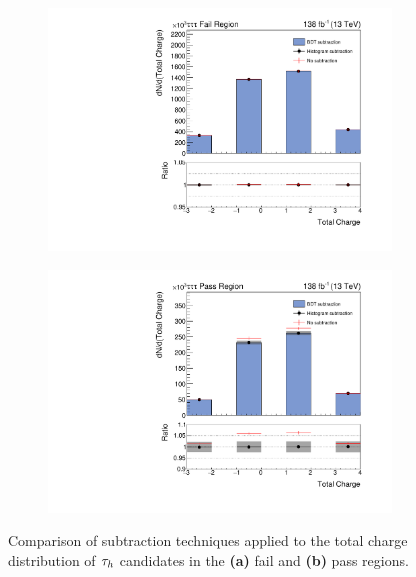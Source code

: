 \begin{figure}[!htbp]
        \centering
        \begin{subfigure}[b]{0.49\textwidth}
            \centering
            \includegraphics[width=\textwidth]{Figures/Chapter6/subtraction_plot_q_sum_ttt_fail.pdf}
            \caption{}
        \end{subfigure}
        \vspace{0.5cm}
        \begin{subfigure}[b]{0.49\textwidth}
            \centering
            \includegraphics[width=\textwidth]{Figures/Chapter6/subtraction_plot_q_sum_ttt_pass.pdf}
            \caption{}
        \end{subfigure}
    \caption[Comparison of subtraction techniques applied to the total charge distribution of $\PGt_h$ candidates.]{Comparison of subtraction techniques applied to the total charge distribution of $\PGt_h$ candidates in the \textbf{(a)} fail and \textbf{(b)} pass regions.}

    \label{Figure:Chapter6_BDTPurificationExample}
\end{figure}


